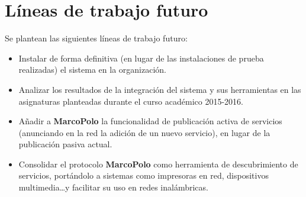 \section{Líneas de trabajo futuro}

Se plantean las siguientes líneas de trabajo futuro:

\begin{itemize}
	\item Instalar de forma definitiva (en lugar de las instalaciones de prueba realizadas) el sistema en la organización.
	\item Analizar los resultados de la integración del sistema y sus herramientas en las asignaturas planteadas durante el curso académico 2015-2016.
	\item Añadir a \textbf{MarcoPolo} la funcionalidad de publicación activa de servicios (anunciando en la red la adición de un nuevo servicio), en lugar de la publicación pasiva actual.
	\item Consolidar el protocolo \textbf{MarcoPolo} como herramienta de descubrimiento de servicios, portándolo a sistemas como impresoras en red, dispositivos multimedia\dots y facilitar su uso en redes inalámbricas.
\end{itemize}